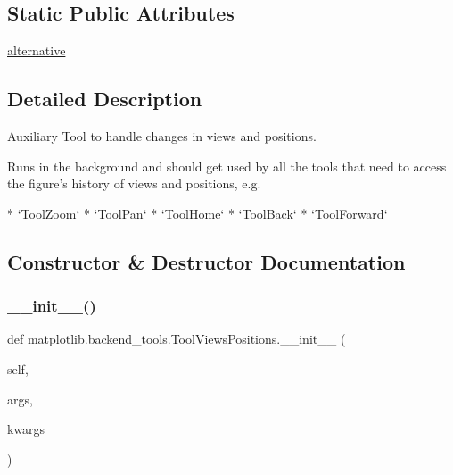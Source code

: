 \subsection*{Static Public Attributes}
\begin{DoxyCompactItemize}
\item 
\hyperlink{classmatplotlib_1_1backend__tools_1_1ToolViewsPositions_a61b928b8e5557aeb30a6aab948930609}{alternative}
\end{DoxyCompactItemize}


\subsection{Detailed Description}
\begin{DoxyVerb}Auxiliary Tool to handle changes in views and positions.

Runs in the background and should get used by all the tools that
need to access the figure's history of views and positions, e.g.

* `ToolZoom`
* `ToolPan`
* `ToolHome`
* `ToolBack`
* `ToolForward`
\end{DoxyVerb}
 

\subsection{Constructor \& Destructor Documentation}
\mbox{\label{classmatplotlib_1_1backend__tools_1_1ToolViewsPositions_a7d7419bd88c3cd320a49de8e9157ea11}} 
\subsubsection{\texorpdfstring{\+\_\+\+\_\+init\+\_\+\+\_\+()}{\_\_init\_\_()}}
{\footnotesize\ttfamily def matplotlib.\+backend\+\_\+tools.\+Tool\+Views\+Positions.\+\_\+\+\_\+init\+\_\+\+\_\+ (\begin{DoxyParamCaption}\item[{}]{self,  }\item[{}]{args,  }\item[{}]{kwargs }\end{DoxyParamCaption})}



